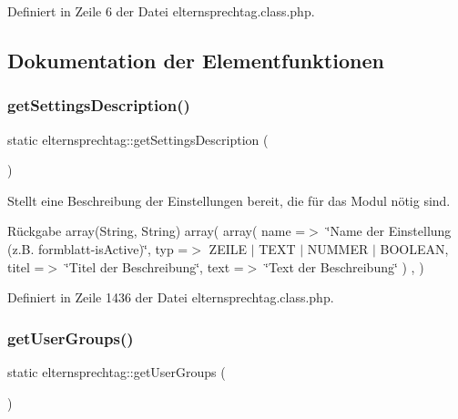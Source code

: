 Definiert in Zeile 6 der Datei elternsprechtag.\+class.\+php.



\subsection{Dokumentation der Elementfunktionen}
\mbox{\label{classelternsprechtag_aaaeb82c52ab2bb136692c19a8381d500}} 
\subsubsection{\texorpdfstring{get\+Settings\+Description()}{getSettingsDescription()}}
{\footnotesize\ttfamily static elternsprechtag\+::get\+Settings\+Description (\begin{DoxyParamCaption}{ }\end{DoxyParamCaption})\hspace{0.3cm}{\ttfamily [static]}}

Stellt eine Beschreibung der Einstellungen bereit, die für das Modul nötig sind. \begin{DoxyReturn}{Rückgabe}
array(\+String, String) array( array( \textquotesingle{}name\textquotesingle{} =$>$ \char`\"{}\+Name der Einstellung (z.\+B. formblatt-\/is\+Active)\char`\"{}, \textquotesingle{}typ\textquotesingle{} =$>$ Z\+E\+I\+LE $\vert$ T\+E\+XT $\vert$ N\+U\+M\+M\+ER $\vert$ B\+O\+O\+L\+E\+AN, \textquotesingle{}titel\textquotesingle{} =$>$ \char`\"{}\+Titel der Beschreibung\char`\"{}, \textquotesingle{}text\textquotesingle{} =$>$ \char`\"{}\+Text der Beschreibung\char`\"{} ) , ) 
\end{DoxyReturn}


Definiert in Zeile 1436 der Datei elternsprechtag.\+class.\+php.

\mbox{\label{classelternsprechtag_a0bbf138f7aaeddd953a9959fedf1f624}} 
\subsubsection{\texorpdfstring{get\+User\+Groups()}{getUserGroups()}}
{\footnotesize\ttfamily static elternsprechtag\+::get\+User\+Groups (\begin{DoxyParamCaption}{ }\end{DoxyParamCaption})\hspace{0.3cm}{\ttfamily [static]}}


